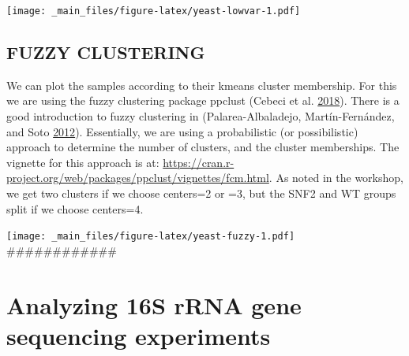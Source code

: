 \documentclass[onecolumn]{book}
\newenvironment{Shaded}{\begin{snugshade}}{\end{snugshade}}
\newcommand{\CommentTok}[1]{\textcolor[rgb]{0.56,0.35,0.01}{\textit{#1}}}
\newcommand{\DataTypeTok}[1]{\textcolor[rgb]{0.13,0.29,0.53}{#1}}
\newcommand{\DecValTok}[1]{\textcolor[rgb]{0.00,0.00,0.81}{#1}}
\newcommand{\KeywordTok}[1]{\textcolor[rgb]{0.13,0.29,0.53}{\textbf{#1}}}
\newcommand{\NormalTok}[1]{#1}
\newcommand{\OperatorTok}[1]{\textcolor[rgb]{0.81,0.36,0.00}{\textbf{#1}}}
\newcommand{\OtherTok}[1]{\textcolor[rgb]{0.56,0.35,0.01}{#1}}
\newcommand{\StringTok}[1]{\textcolor[rgb]{0.31,0.60,0.02}{#1}}
\theoremstyle{definition}
\theoremstyle{definition}
\theoremstyle{definition}
\theoremstyle{remark}
\begin{document}
\texttt{[image: \_main\_files/figure-latex/yeast-lowvar-1.pdf]} \clearpage

\hypertarget{fuzzy-clustering}{%
\section{FUZZY CLUSTERING}\label{fuzzy-clustering}}

We can plot the samples according to their kmeans cluster membership.
For this we are using the fuzzy clustering package ppclust (Cebeci et
al. \protect\hyperlink{ref-fuzzy:2018}{2018}). There is a good
introduction to fuzzy clustering in (Palarea-Albaladejo,
Martín-Fernández, and Soto
\protect\hyperlink{ref-fernandez:2012}{2012}). Essentially, we are using
a probabilistic (or possibilistic) approach to determine the number of
clusters, and the cluster memberships. The vignette for this approach is
at:
\url{https://cran.r-project.org/web/packages/ppclust/vignettes/fcm.html}.
As noted in the workshop, we get two clusters if we choose centers=2 or
=3, but the SNF2 and WT groups split if we choose centers=4.

\begin{Shaded}
\end{Shaded}

\texttt{[image: \_main\_files/figure-latex/yeast-fuzzy-1.pdf]}
\#\#\#\#\#\#\#\#\#\#\#\#

\hypertarget{analyzing-16s-rrna-gene-sequencing-experiments}{%
\chapter{Analyzing 16S rRNA gene sequencing
experiments}\label{analyzing-16s-rrna-gene-sequencing-experiments}}
\end{document}
